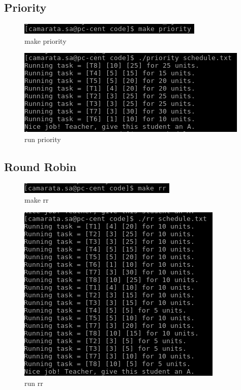 \documentclass[10pt]{article}
\begin{document}
\subsection{Priority}

\begin{figure}[H]
\centering
\includegraphics[scale=0.5]{./images/make_pri.png}
\caption{make priority}
\label{fig:Code}
\end{figure}

\begin{figure}[H]
\centering
\includegraphics[scale=0.5]{./images/run_pri.png}
\caption{run priority}
\label{fig:Code}
\end{figure}

\subsection{Round Robin}

\begin{figure}[H]
\centering
\includegraphics[scale=0.5]{./images/make_rr.png}
\caption{make rr}
\label{fig:Code}
\end{figure}

\begin{figure}[H]
\centering
\includegraphics[scale=0.5]{./images/run_rr.png}
\caption{run rr}
\label{fig:Code}
\end{figure}
\end{document}
